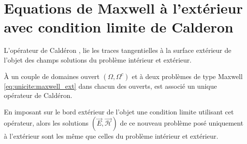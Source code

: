 \documentclass[12pt,%
    twoside,%
    a4paper,%
    openright, %
    ]{book}
\numberwithin{equation}{section} %
\newcommand{\vect}[1]{{\overset{\rightarrow}{#1}}}
\newcommand{\vE}{\vect{E}}
\newcommand{\cH}{\mathcal{H}}
\newcommand{\vH}{\vect{\cH}}
\begin{document}
\section{Equations de Maxwell à l'extérieur avec condition limite de Calderon}
    L'opérateur de Caldéron \cite[Def~4, p.~108]{cessenat_mathematical_1996}, lie les traces tangentielles à la surface extérieur de l'objet des champs solutions du problème intérieur et extérieur.
    
    À un couple de domaines ouvert \((\Omega, \Omega^c)\) et à deux problèmes de type Maxwell \eqref{eq:unicite:maxwell_ext} dans chacun des ouverts, est associé un unique opérateur de Caldéron.

    En imposant sur le bord extérieur de l'objet une condition limite utilisant cet opérateur, alors les solutions \((\vE,\vH)\) de ce nouveau problème posé uniquement à l'extérieur sont les même que celles du problème intérieur et extérieur.
\end{document}
